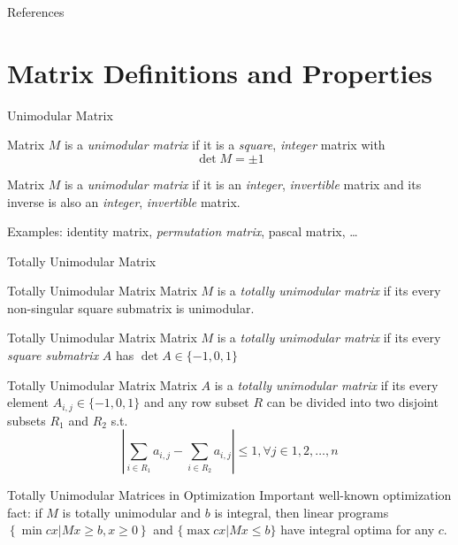\documentclass[presentation,professionalfonts]{beamer}
\begin{document}
\begin{frame}[fragile]{References}
\printbibliography
\end{frame}

\appendix

\section{Matrix Definitions and Properties}

\begin{frame}{Unimodular Matrix}
  \begin{definition}
    Matrix \(M\) is a \emph{unimodular matrix} if it is a \emph{square}, \emph{integer} matrix with \[\det M = \pm 1\]
  \end{definition}
  \begin{definition}
    Matrix \(M\) is a \emph{unimodular matrix} if it is an
    \emph{integer}, \emph{invertible} matrix and its inverse is also
    an \emph{integer}, \emph{invertible} matrix.
  \end{definition}
  Examples: identity matrix, \emph{permutation matrix}, pascal matrix, \dots
\end{frame}

\begin{frame}{Totally Unimodular Matrix}
  \begin{definition}{Totally Unimodular Matrix}
    Matrix \(M\) is a \emph{totally unimodular matrix} if its every
    non-singular square submatrix is unimodular.
  \end{definition}

  \begin{definition}{Totally Unimodular Matrix}
    Matrix \(M\) is a \emph{totally unimodular matrix} if its every
    \emph{square submatrix} \(A\) has \(\det A\in \{-1, 0, 1\}\)
  \end{definition}

  \begin{definition}{Totally Unimodular Matrix}
    Matrix \(A\) is a \emph{totally unimodular matrix} if its every
    element \(A_{i, j}\in \{-1, 0, 1\}\) and any row subset \(R\) can
    be divided into two disjoint subsets \(R_1\) and \(R_2\) s.t.
    \[\left|\sum_{i\in R_1} a_{i, j} - \sum_{i\in R_2}a_{i, j}\right| \leq 1, \forall j\in{1, 2, \dots, n}\]
    \end{definition}
\end{frame}

\begin{frame}{Totally Unimodular Matrices in Optimization}
  Important well-known optimization fact: if \(M\) is totally
  unimodular and \(b\) is integral, then linear programs \(\left\{\min
  cx | Mx \geq b, x\geq 0\right\}\) and \(\{\max cx | Mx \leq b\}\)
  have integral optima for any \(c\).
\end{frame}
\end{document}
